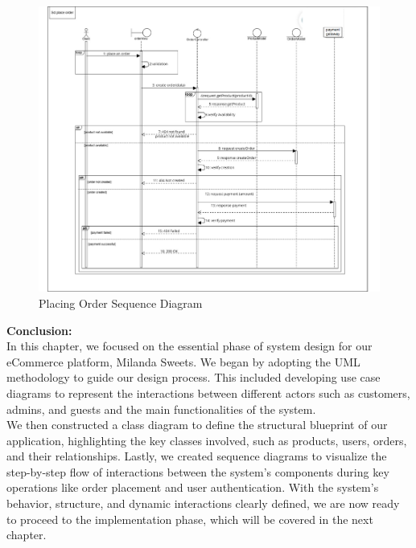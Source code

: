 \newpage
\begin{figure}[!h]
\begin{center}
\includegraphics{images/Placing Order Sequence Diagram.png}
\end{center}
\caption{Placing Order Sequence Diagram}
\end{figure}

{\Large \textbf{Conclusion:}}\\

In this chapter, we focused on the essential phase of system design for our eCommerce platform, Milanda Sweets. We began by adopting the UML methodology to guide our design process. This included developing use case diagrams to represent the interactions between different actors such as customers, admins, and guests and the main functionalities of the system.\\

We then constructed a class diagram to define the structural blueprint of our application, highlighting the key classes involved, such as products, users, orders, and their relationships. Lastly, we created sequence diagrams to visualize the step-by-step flow of interactions between the system’s components during key operations like order placement and user authentication.
With the system’s behavior, structure, and dynamic interactions clearly defined, we are now ready to proceed to the implementation phase, which will be covered in the next chapter.

